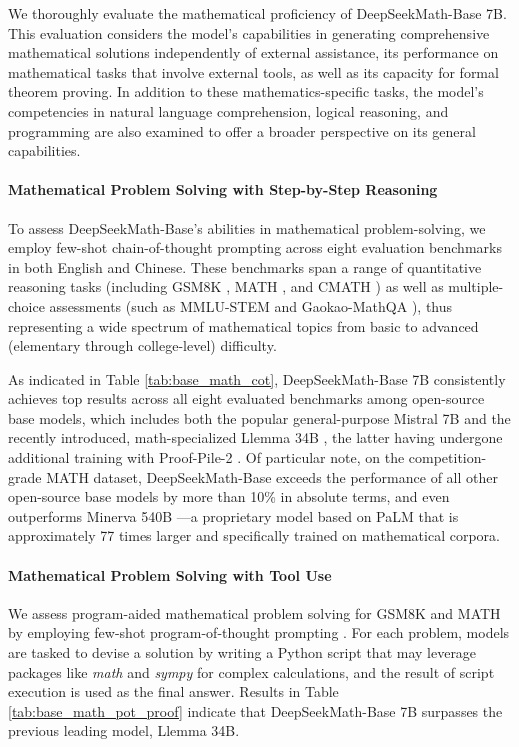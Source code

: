 We thoroughly evaluate the mathematical proficiency of DeepSeekMath-Base 7B. This evaluation considers the model’s capabilities in generating comprehensive mathematical solutions independently of external assistance, its performance on mathematical tasks that involve external tools, as well as its capacity for formal theorem proving. In addition to these mathematics-specific tasks, the model’s competencies in natural language comprehension, logical reasoning, and programming are also examined to offer a broader perspective on its general capabilities.

\paragraph{Mathematical Problem Solving with Step-by-Step Reasoning}

To assess DeepSeekMath-Base’s abilities in mathematical problem-solving, we employ few-shot chain-of-thought prompting \citep{cot} across eight evaluation benchmarks in both English and Chinese. These benchmarks span a range of quantitative reasoning tasks (including GSM8K \citep{gsm8k}, MATH \citep{MATH}, and CMATH \citep{wei2023cmath}) as well as multiple-choice assessments (such as MMLU-STEM \citep{mmlu} and Gaokao-MathQA \citep{agieval}), thus representing a wide spectrum of mathematical topics from basic to advanced (elementary through college-level) difficulty.

As indicated in Table \ref{tab:base_math_cot}, DeepSeekMath-Base 7B consistently achieves top results across all eight evaluated benchmarks among open-source base models, which includes both the popular general-purpose Mistral 7B \citep{mistral} and the recently introduced, math-specialized Llemma 34B \citep{llemma}, the latter having undergone additional training with Proof-Pile-2 \citep{llemma}. Of particular note, on the competition-grade MATH dataset, DeepSeekMath-Base exceeds the performance of all other open-source base models by more than 10\% in absolute terms, and even outperforms Minerva 540B \citep{minerva}—a proprietary model based on PaLM \citep{palm} that is approximately 77 times larger and specifically trained on mathematical corpora.

\paragraph{Mathematical Problem Solving with Tool Use} We assess program-aided mathematical problem solving for GSM8K and MATH by employing few-shot program-of-thought prompting \citep{pot,pal}. For each problem, models are tasked to devise a solution by writing a Python script that may leverage packages like \textit{math} and \textit{sympy} for complex calculations, and the result of script execution is used as the final answer. Results in Table \ref{tab:base_math_pot_proof} indicate that DeepSeekMath-Base 7B surpasses the previous leading model, Llemma 34B.

